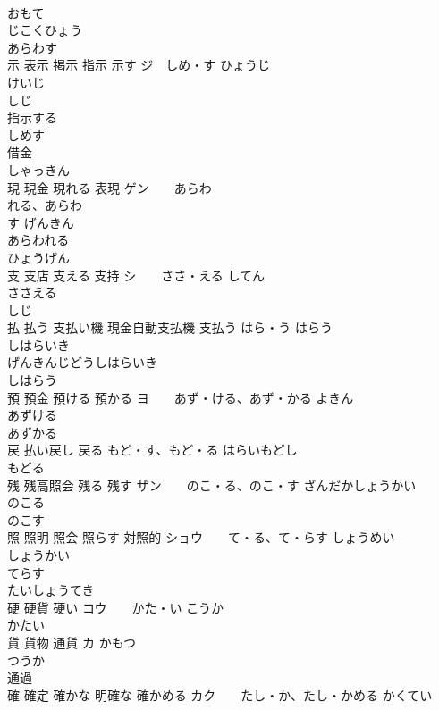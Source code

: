 \documentclass[8pt]{extreport}
\begin{document}
\begin{CJK}{UTF8}{min}
\\	おもて　
\\	じこくひょう　
\\	あらわす　
\\	示 表示 掲示 指示 示す	ジ　しめ・す ひょうじ　
\\	けいじ　
\\	しじ 
\\	指示する
\\	しめす　
\\	借金	
\\	しゃっきん
\\	現 現金 現れる 表現	ゲン　　あらわ
\\	れる、あらわ
\\	す げんきん　　
\\	あらわれる 
\\	ひょうげん　　
\\	支 支店 支える 支持	シ　　ささ・える してん　
\\	ささえる　　
\\	しじ　　
\\	払 払う 支払い機 現金自動支払機 支払う	はら・う はらう 
\\	しはらいき 
\\	げんきんじどうしはらいき　
\\	しはらう 
\\	預 預金 預ける 預かる	ヨ　　あず・ける、あず・かる よきん 
\\	あずける 
\\	あずかる 
\\	戻 払い戻し 戻る	もど・す、もど・る はらいもどし　　
\\	もどる 
\\	残 残高照会 残る 残す	ザン　　のこ・る、のこ・す ざんだかしょうかい　　
\\	のこる　　
\\	のこす　　
\\	照 照明 照会 照らす 対照的	ショウ　　て・る、て・らす しょうめい　
\\	しょうかい 
\\	てらす　
\\	たいしょうてき　
\\	硬 硬貨 硬い	コウ　　かた・い こうか　
\\	かたい　
\\	貨 貨物 通貨	カ かもつ 
\\	つうか 
\\	通過
\\	確 確定 確かな 明確な 確かめる	カク　　たし・か、たし・かめる かくてい 

\end{CJK}
\end{document}
